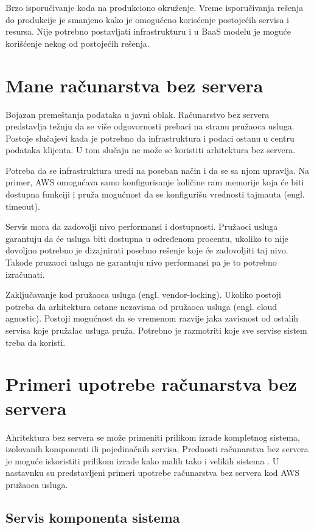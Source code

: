 \documentclass[12pt,oneside]{memoir}
\begin{document}
Brzo isporučivanje koda na produkciono okruženje. Vreme isporučivanja rešenja do produkcije je smanjeno kako je omogućeno korisćenje postojećih servisa i resursa. Nije potrebno postavljati infrastrukturu i u BaaS modelu je moguće korišćenje nekog od postojećih rešenja.

\section{Mane računarstva bez servera}

Bojazan premeštanja podataka u javni oblak. Računarstvo bez servera predstavlja težnju da se više odgovornosti prebaci na stranu pružaoca usluga. Postoje slučajevi kada je potrebno da infrastruktura i podaci ostanu u centru podataka klijenta. U tom slučaju ne može se koristiti arhitektura bez servera\cite{sa}.

Potreba da se infrastruktura uredi na poseban način i da se sa njom upravlja. Na primer, AWS omogućava samo konfigurisanje količine ram memorije koja će biti dostupna funkciji i pruža mogućnost da se konfigurišu vrednosti tajmauta (engl. timeout). %

Servis mora da zadovolji nivo performansi i dostupnosti. Pružaoci usluga garantuju da će usluga biti dostupna u određenom procentu, ukoliko to nije dovoljno potrebno je dizajnirati posebno rešenje koje će zadovoljiti taj nivo. Takođe pruzaoci usluga ne garantuju nivo performansi pa je to potrebno izračunati\cite{sa}.

Zaključavanje kod pružaoca usluga (engl. vendor-locking). Ukoliko postoji potreba da arhitektura ostane nezavisna od pružaoca usluga (engl. cloud agnostic). Postoji mogućnost da se vremenom razvije jaka zavisnost od ostalih servisa koje pružalac usluga pruža. Potrebno je razmotriti koje sve servise sistem treba da koristi.
 

\section{Primeri upotrebe računarstva bez servera}

Ahritektura bez servera se može primeniti prilikom izrade kompletnog sistema, izolovanih komponenti ili pojedinačnih servisa. Prednosti računarstva bez servera je moguće iskoristiti prilikom izrade kako malih tako i velikih sistema \cite{sa}. U nastavnku su predstavljeni primeri upotrebe računarstva bez servera kod AWS pružaoca usluga.

\subsection{Servis komponenta sistema}
\end{document}
